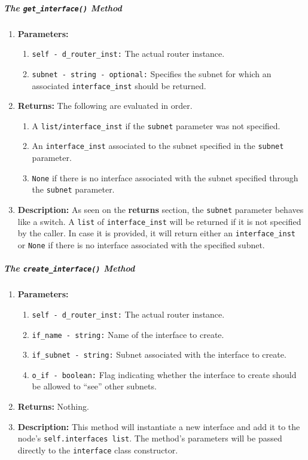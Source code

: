         \subparagraph{The \texttt{get\_interface()} Method}
            \begin{enumerate}
                \item \textbf{Parameters:}
                \begin{enumerate}
                    \item \texttt{self - d\_router\_inst:} The actual router instance.
                    \item \texttt{subnet - string - optional:} Specifies the subnet for which an associated \texttt{interface\_inst} should be returned.
                \end{enumerate}
                \item \textbf{Returns:} The following are evaluated in order.
                \begin{enumerate}
                    \item A \texttt{list/interface\_inst} if the \texttt{subnet} parameter was not specified.
                    \item An \texttt{interface\_inst} associated to the subnet specified in the \texttt{subnet} parameter.
                    \item \texttt{None} if there is no interface associated with the subnet specified through the \texttt{subnet} parameter.
                \end{enumerate}
                \item \textbf{Description:} As seen on the \textbf{returns} section, the \texttt{subnet} parameter behaves like a switch. A \texttt{list} of \texttt{interface\_inst} will be returned if it is not specified by the caller. In case it is provided, it will return either an \texttt{interface\_inst} or \texttt{None} if there is no interface associated with the specified subnet.
            \end{enumerate}

        \subparagraph{The \texttt{create\_interface()} Method}
            \begin{enumerate}
                \item \textbf{Parameters:}
                \begin{enumerate}
                    \item \texttt{self - d\_router\_inst:} The actual router instance.
                    \item \texttt{if\_name - string:} Name of the interface to create.
                    \item \texttt{if\_subnet - string:} Subnet associated with the interface to create.
                    \item \texttt{o\_if - boolean:} Flag indicating whether the interface to create should be allowed to ``see'' other subnets.
                \end{enumerate}
                \item \textbf{Returns:} Nothing.
                \item \textbf{Description:} This method will instantiate a new interface and add it to the node's \texttt{self.interfaces list}. The method's parameters will be passed directly to the \texttt{interface} class constructor.
            \end{enumerate}

